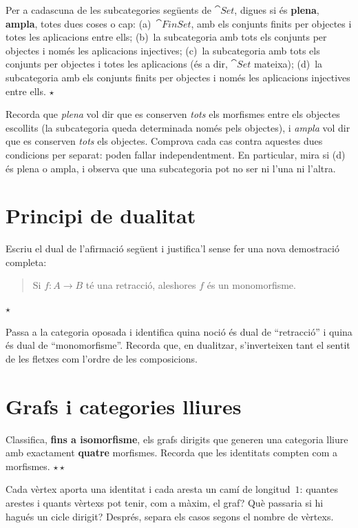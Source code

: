 \begin{exercici}
Per a cadascuna de les subcategories següents de $\cat{Set}$, digues si és \textbf{plena}, \textbf{ampla}, totes dues coses o cap: (a)~$\cat{FinSet}$, amb els conjunts finits per objectes i totes les aplicacions entre ells; (b)~la subcategoria amb tots els conjunts per objectes i només les aplicacions injectives; (c)~la subcategoria amb tots els conjunts per objectes i totes les aplicacions (és a dir, $\cat{Set}$ mateixa); (d)~la subcategoria amb els conjunts finits per objectes i només les aplicacions injectives entre ells. \hfill{\normalfont$\star$}
\begin{indicacio}
Recorda que \emph{plena} vol dir que es conserven \emph{tots} els morfismes entre els objectes escollits (la subcategoria queda determinada només pels objectes), i \emph{ampla} vol dir que es conserven \emph{tots} els objectes. Comprova cada cas contra aquestes dues condicions per separat: poden fallar independentment. En particular, mira si (d) és plena o ampla, i observa que una subcategoria pot no ser ni l'una ni l'altra.
\end{indicacio}
\end{exercici}

\section{Principi de dualitat}

\begin{exercici}
Escriu el dual de l'afirmació següent i justifica'l sense fer una nova demostració completa:
\begin{quote}
Si $f\colon A\to B$ té una retracció, aleshores $f$ és un monomorfisme.
\end{quote}
\hfill{\normalfont$\star$}
\begin{indicacio}
Passa a la categoria oposada i identifica quina noció és dual de \enquote{retracció} i quina és dual de \enquote{monomorfisme}. Recorda que, en dualitzar, s'inverteixen tant el sentit de les fletxes com l'ordre de les composicions.
\end{indicacio}
\end{exercici}

\section{Grafs i categories lliures}

\begin{exercici}
Classifica, \textbf{fins a isomorfisme}, els grafs dirigits que generen una categoria lliure amb exactament \textbf{quatre} morfismes. Recorda que les identitats compten com a morfismes. \hfill{\normalfont$\star\star$}
\begin{indicacio}
Cada vèrtex aporta una identitat i cada aresta un camí de longitud~$1$: quantes arestes i quants vèrtexs pot tenir, com a màxim, el graf? Què passaria si hi hagués un cicle dirigit? Després, separa els casos segons el nombre de vèrtexs.
\end{indicacio}
\end{exercici}


